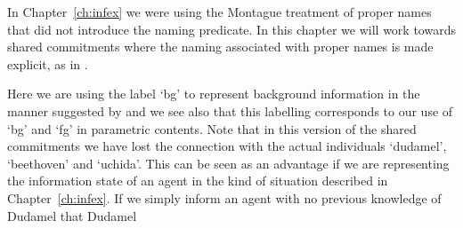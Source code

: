 In Chapter~\ref{ch:infex} we were using the Montague treatment of
proper names that did not introduce the naming predicate.  In this
chapter we will work towards shared commitments where the naming
associated with proper names is made explicit, as in \nexteg{}.
\begin{ex} 
\label{ex:gameboardDudamelBeethovenUchidaBg}  
\end{ex} 
Here we are using the label `bg' to represent background information
in the manner suggested by \cite{Larsson2010} and we see also that
this labelling
corresponds to our use of `bg' and `fg' in parametric contents.  Note that in this
version of the shared commitments we have lost the connection with the
actual individuals `dudamel', `beethoven' and `uchida'.  This can be
seen as an advantage if we are representing the information state of
an agent in the kind of situation described in Chapter~\ref{ch:infex}.
If we simply inform an agent with no previous knowledge of Dudamel that Dudamel
